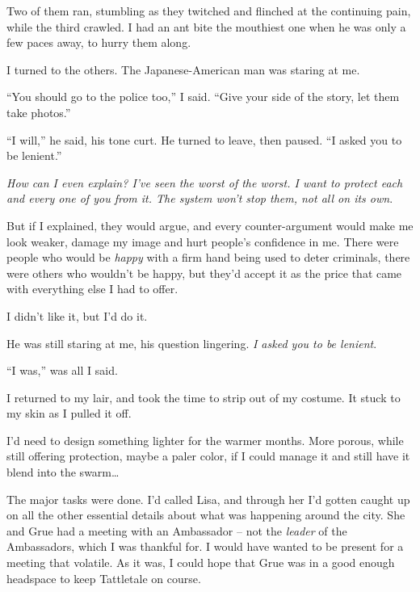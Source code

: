 Two of them ran, stumbling as they twitched and flinched at the continuing pain, while the third crawled.  I had an ant bite the mouthiest one when he was only a few paces away, to hurry them along.



I turned to the others.  The Japanese-American man was staring at me.



``You should go to the police too,'' I said.  ``Give your side of the story, let them take photos.''



``I will,'' he said, his tone curt.  He turned to leave, then paused.  ``I asked you to be lenient.''



\emph{How can I even explain?  I've seen the worst of the worst.  I want to protect each and every one of you from it.  The system won't stop them, not all on its own}.



But if I explained, they would argue, and every counter-argument would make me look weaker, damage my image and hurt people's confidence in me.  There were people who would be \emph{happy} with a firm hand being used to deter criminals, there were others who wouldn't be happy, but they'd accept it as the price that came with everything else I had to offer.



I didn't like it, but I'd do it.



He was still staring at me, his question lingering.  \emph{I asked you to be lenient}.



``I was,'' was all I said.



\sectionbreak



I returned to my lair, and took the time to strip out of my costume.  It stuck to my skin as I pulled it off.



I'd need to design something lighter for the warmer months.  More porous, while still offering protection, maybe a paler color, if I could manage it and still have it blend into the swarm\ldots



The major tasks were done.  I'd called Lisa, and through her I'd gotten caught up on all the other essential details about what was happening around the city.  She and Grue had a meeting with an Ambassador – not the \emph{leader} of the Ambassadors, which I was thankful for.  I would have wanted to be present for a meeting that volatile.  As it was, I could hope that Grue was in a good enough headspace to keep Tattletale on course.



